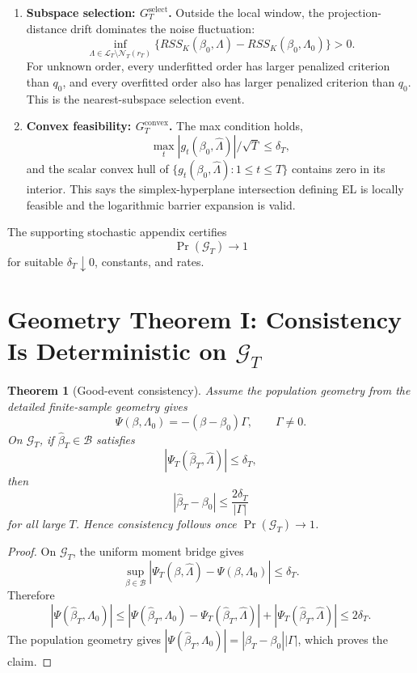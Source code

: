 \documentclass[12pt]{article}
\numberwithin{equation}{section}
\newtheorem{theorem}{Theorem}
\theoremstyle{definition}
\begin{document}
\begin{enumerate}[leftmargin=2em]
\item \textbf{Subspace selection: \(G_T^{\mathrm{select}}\).} Outside the local
window, the projection-distance drift dominates the noise fluctuation:
\[
    \inf_{\Lambda\in\mathcal L_T\setminus\mathcal N_T(r_T)}
    \{RSS_K(\beta_0,\Lambda)-RSS_K(\beta_0,\Lambda_0)\}>0.
\]
For unknown order, every underfitted order has larger penalized criterion than
\(q_0\), and every overfitted order also has larger penalized criterion than
\(q_0\). This is the nearest-subspace selection event.

\item \textbf{Convex feasibility: \(G_T^{\mathrm{convex}}\).} The max condition
holds,
\[
    \max_t|g_t(\beta_0,\widehat\Lambda)|/\sqrt T\le\delta_T,
\]
and the scalar convex hull of
\(\{g_t(\beta_0,\widehat\Lambda):1\le t\le T\}\) contains zero in its interior.
This says the simplex-hyperplane intersection defining EL is locally feasible
and the logarithmic barrier expansion is valid.
\end{enumerate}

The supporting stochastic appendix certifies
\[
    \Pr(\mathcal G_T)\to1
\]
for suitable \(\delta_T\downarrow0\), constants, and rates.
\section{Geometry Theorem I: Consistency Is Deterministic on \texorpdfstring{\(\mathcal G_T\)}{GT}}

\begin{theorem}[Good-event consistency]
\label{thm:v2-good-event-consistency}
Assume the population geometry from the detailed finite-sample geometry gives
\[
    \Psi(\beta,\Lambda_0)=-(\beta-\beta_0)\Gamma,
    \qquad \Gamma\ne0.
\]
On \(\mathcal G_T\), if \(\widehat\beta_T\in\mathcal B\) satisfies
\[
    |\Psi_T(\widehat\beta_T,\widehat\Lambda)|\le\delta_T,
\]
then
\[
    |\widehat\beta_T-\beta_0|\le \frac{2\delta_T}{|\Gamma|}
\]
for all large \(T\). Hence consistency follows once
\(\Pr(\mathcal G_T)\to1\).
\end{theorem}

\begin{proof}
On \(\mathcal G_T\), the uniform moment bridge gives
\[
    \sup_{\beta\in\mathcal B}
    |\Psi_T(\beta,\widehat\Lambda)-\Psi(\beta,\Lambda_0)|\le\delta_T.
\]
Therefore
\[
    |\Psi(\widehat\beta_T,\Lambda_0)|
    \le |\Psi(\widehat\beta_T,\Lambda_0)
          -\Psi_T(\widehat\beta_T,\widehat\Lambda)|
       +|\Psi_T(\widehat\beta_T,\widehat\Lambda)|
    \le 2\delta_T.
\]
The population geometry gives
\(|\Psi(\widehat\beta_T,\Lambda_0)|=|\widehat\beta_T-\beta_0||\Gamma|\), which
proves the claim.
\end{proof}
\end{document}
